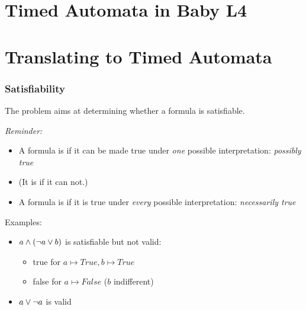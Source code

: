 \documentclass{beamer}
\begin{document}
\section{Timed Automata in Baby L4}


\section{Translating to Timed Automata}






\begin{frame}[fragile]\frametitle{Satisfiability}


The  problem aims at determining whether a formula is
satisfiable.

\emph{Reminder:}
\begin{itemize}
\item A formula is  if it can be made true under \emph{one}
  possible interpretation: \emph{possibly true}
\item (It is   if it can not.)
\item A formula is  if it is true under \emph{every}
  possible interpretation: \emph{necessarily true}
\end{itemize}

\vspace{3mm}
Examples:
\begin{itemize}
\item $a \wedge (\neg a \vee b)$ is satisfiable but not valid:
  \begin{itemize}
  \item true for $a \mapsto True, b \mapsto True$
  \item false for $a \mapsto False$ ($b$ indifferent)
  \end{itemize}
\item $a \vee \neg a$ is valid  
\end{itemize}

\end{frame}
\end{document}
